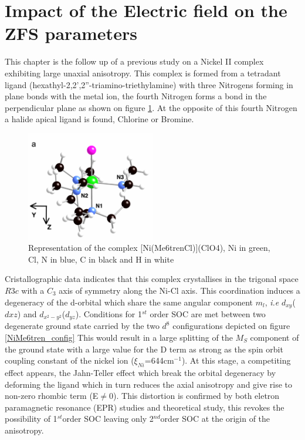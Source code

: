 \documentclass[10pt]{report}
\numberwithin{equation}{section}
\begin{document}
\section{Impact of the Electric field on the ZFS parameters}

This chapter is the follow up of a previous study on a Nickel II complex exhibiting large unaxial anisotropy.
This complex is formed from a tetradant ligand (hexathyl-2,2',2''-triamino-triethylamine) with three Nitrogens forming in plane bonds with the metal ion, the fourth Nitrogen forms a bond in the perpendicular plane as shown on figure \ref{NiMe6tren}.
At the opposite of this fourth Nitrogen a halide apical ligand is found, Chlorine or Bromine.

\begin{figure}[h!]
    \centering
    \includegraphics[width=0.5\textwidth]{Images/NiMe6trenTalal.png}
    \caption{Representation of the complex [Ni(Me6trenCl)](ClO4), Ni in green, Cl, N in blue, C in black and H in white}
    \label{NiMe6tren}
\end{figure}

Cristallographic data indicates that this complex crystallises in the trigonal space $R3c$ with a $C_3$ axis of symmetry along the Ni-Cl axis.
This coordination induces a degeneracy of the d-orbital which share the same angular component $m_l$, \textit{i.e} $d_{xy}$($d{xz}$) and $d_{x^2-y^2}$($d_{yz}$). 
Conditions for 1$^{st}$ order SOC are met between two degenerate ground state carried by the two $d^8$ configurations depicted on figure \ref{NiMe6tren_config}
This would result in a large splitting of the $M_S$ component of the ground state with a large value for the D term as strong as the spin orbit coupling constant of the nickel ion ($\xi_{Ni}$=644cm$^{-1}$).
At this stage, a competiting effect appears, the Jahn-Teller effect which break the orbital degeneracy by deforming the ligand which in turn reduces the axial anisotropy and give rise to non-zero rhombic term (E$\neq$0).
This distortion is confirmed by both eletron paramagnetic resonance (EPR) studies and theoretical study, this revokes the possibility of 1$^{st}$order SOC leaving only 2$^{nd}$order SOC at the origin of the anisotropy.
\end{document}
